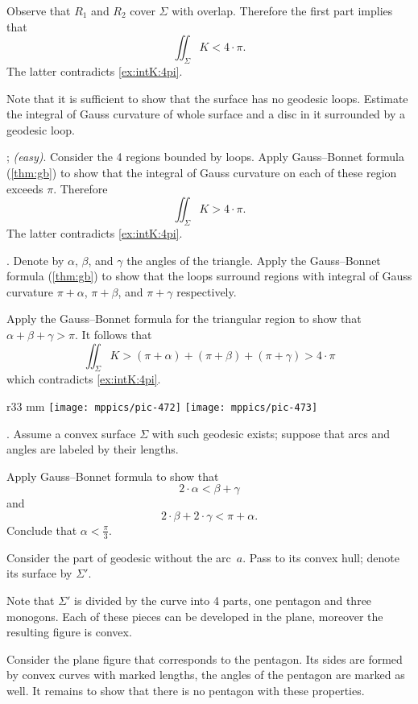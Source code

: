 Observe that $R_1$ and $R_2$ cover $\Sigma$ with overlap.
Therefore the first part implies that 
\[\iint_\Sigma K< 4\cdot\pi.\]
The latter contradicts \ref{ex:intK:4pi}.

 Note that it is sufficient to show that the surface has no geodesic loops.
Estimate the integral of Gauss curvature of whole surface and a disc in it surrounded by a geodesic loop.

\parbf{\ref{ex:self-intersections}}; \textit{(easy)}.
Consider the 4 regions bounded by loops.
Apply Gauss--Bonnet formula (\ref{thm:gb}) to show that the integral of Gauss curvature on each of these region exceeds $\pi$.
Therefore 
\[\iint_\Sigma K>4\cdot\pi.\]
The latter contradicts \ref{ex:intK:4pi}.

.
Denote by $\alpha$, $\beta$, and $\gamma$ the angles of the triangle.
Apply the Gauss--Bonnet formula (\ref{thm:gb}) to show that the loops surround regions with integral of Gauss curvature $\pi+\alpha$, $\pi+\beta$, and $\pi+\gamma$ respectively.

Apply the Gauss--Bonnet formula for the triangular region to show that $\alpha+\beta+\gamma>\pi$.
It follows that 
\[\iint_\Sigma K>(\pi+\alpha)+(\pi+\beta)+(\pi+\gamma)>4\cdot\pi\]
which contradicts \ref{ex:intK:4pi}.

\begin{wrapfigure}{r}{33 mm}
\vskip-0mm
\centering
\texttt{[image: mppics/pic-472]}
\bigskip
\texttt{[image: mppics/pic-473]}
\vskip8mm
\end{wrapfigure}

.
Assume a convex surface $\Sigma$ with such geodesic exists;
suppose that arcs and angles are labeled by their lengths.

Apply Gauss--Bonnet formula to show that
\[2\cdot\alpha<\beta+\gamma\]
and 
\[2\cdot\beta+2\cdot \gamma<\pi+\alpha.\]
Conclude that $\alpha <\tfrac \pi 3$.

Consider the part of geodesic without the arc~$a$.
Pass to its convex hull;
denote its surface by $\Sigma'$.

Note that $\Sigma'$ is divided by the curve into 4 parts, one pentagon and three monogons.
Each of these pieces can be developed in the plane, moreover the resulting figure is convex.

Consider the plane figure that corresponds to the pentagon. 
Its sides are formed by convex curves with marked lengths, the angles of the pentagon are marked as well.
It remains to show that there is no pentagon with these properties.


